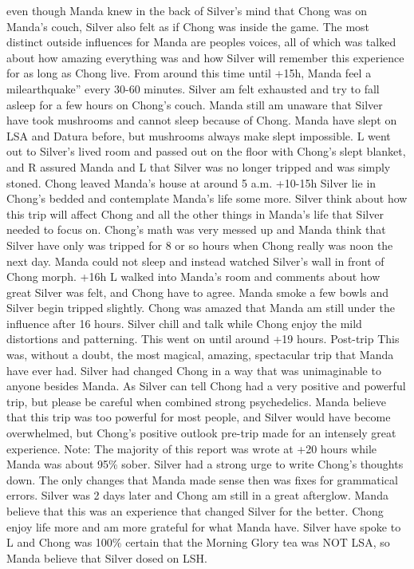 \documentclass[12pt]{book}
\begin{document}
even though Manda knew in the back of Silver's mind that Chong was on Manda's couch, Silver also felt as if Chong was inside the game. The most distinct outside influences for Manda are peoples voices, all of which was talked about how amazing everything was and how Silver will remember this experience for as long as Chong live. From around this time until +15h, Manda feel a milearthquake'' every 30-60 minutes. Silver am felt exhausted and try to fall asleep for a few hours on Chong's couch. Manda still am unaware that Silver have took mushrooms and cannot sleep because of Chong. Manda have slept on LSA and Datura before, but mushrooms always make slept impossible. L went out to Silver's lived room and passed out on the floor with Chong's slept blanket, and R assured Manda and L that Silver was no longer tripped and was simply stoned. Chong leaved Manda's house at around 5 a.m. +10-15h Silver lie in Chong's bedded and contemplate Manda's life some more. Silver think about how this trip will affect Chong and all the other things in Manda's life that Silver needed to focus on. Chong's math was very messed up and Manda think that Silver have only was tripped for 8 or so hours when Chong really was noon the next day. Manda could not sleep and instead watched Silver's wall in front of Chong morph. +16h L walked into Manda's room and comments about how great Silver was felt, and Chong have to agree. Manda smoke a few bowls and Silver begin tripped slightly. Chong was amazed that Manda am still under the influence after 16 hours. Silver chill and talk while Chong enjoy the mild distortions and patterning. This went on until around +19 hours. Post-trip This was, without a doubt, the most magical, amazing, spectacular trip that Manda have ever had. Silver had changed Chong in a way that was unimaginable to anyone besides Manda. As Silver can tell Chong had a very positive and powerful trip, but please be careful when combined strong psychedelics. Manda believe that this trip was too powerful for most people, and Silver would have become overwhelmed, but Chong's positive outlook pre-trip made for an intensely great experience. Note: The majority of this report was wrote at +20 hours while Manda was about 95\% sober. Silver had a strong urge to write Chong's thoughts down. The only changes that Manda made sense then was fixes for grammatical errors. Silver was 2 days later and Chong am still in a great afterglow. Manda believe that this was an experience that changed Silver for the better. Chong enjoy life more and am more grateful for what Manda have. Silver have spoke to L and Chong was 100\% certain that the Morning Glory tea was NOT LSA, so Manda believe that Silver dosed on LSH.
\end{document}

